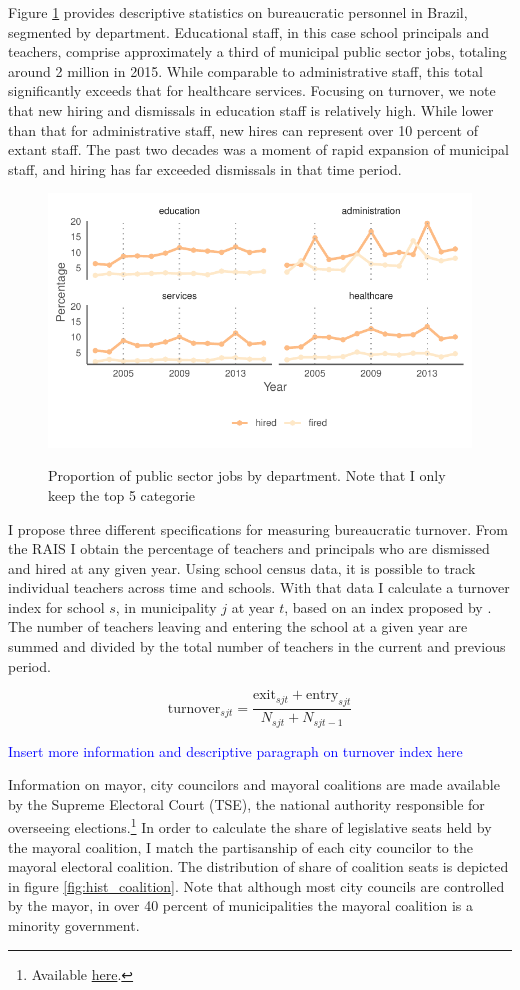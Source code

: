 \documentclass[12pt,a4paper]{article}
\newcommand{\blue}{\textcolor{blue}}
\begin{document}
Figure \ref{fig:staff_turnover} provides descriptive statistics on bureaucratic personnel in Brazil, segmented by department. Educational staff, in this case school principals and teachers, comprise approximately a third of municipal public sector jobs, totaling around 2 million in 2015. While comparable to administrative staff, this total significantly exceeds that for healthcare services. Focusing on turnover, we note that new hiring and dismissals in education staff is relatively high. While lower than that for administrative staff, new hires can represent over 10 percent of extant staff. The past two decades was a moment of rapid expansion of municipal staff, and hiring has far exceeded dismissals in that time period.

\begin{figure}[h]
    \centering
    \includegraphics[width=0.\linewidth]{plots/descriptive_staff_turnover.pdf}
    \label{fig:staff_turnover}
    \caption{Proportion of public sector jobs by department. Note that I only keep the top 5 categorie}
\end{figure}

I propose three different specifications for measuring bureaucratic turnover. From the RAIS I obtain the percentage of teachers and principals who are dismissed and hired at any given year. Using school census data, it is possible to track individual teachers across time and schools. With that data I calculate a turnover index for school $s$, in municipality $j$ at year $t$, based on an index proposed by \citet{pereira_junior_indicadores_2016}. The number of teachers leaving and entering the school at a given year are summed and divided by the total number of teachers in the current and previous period.

$$\text{turnover}_{sjt} = \frac{\text{exit}_{sjt} + \text{entry}_{sjt}}{N_{sjt} + N_{sjt-1}}$$

\blue{Insert more information and descriptive paragraph on turnover index here}

Information on mayor, city councilors and mayoral coalitions are made available by the Supreme Electoral Court (TSE), the national authority responsible for overseeing elections.\footnote{Available \hyperlink{http://www.tse.jus.br/eleicoes/estatisticas/repositorio-de-dados-eleitorais-1}{here}.} In order to calculate the share of legislative seats held by the mayoral coalition, I match the partisanship of each city councilor to the mayoral electoral coalition. The distribution of share of coalition seats is depicted in figure \ref{fig:hist_coalition}. Note that although most city councils are controlled by the mayor, in over 40 percent of municipalities the mayoral coalition is a minority government.
\end{document}
